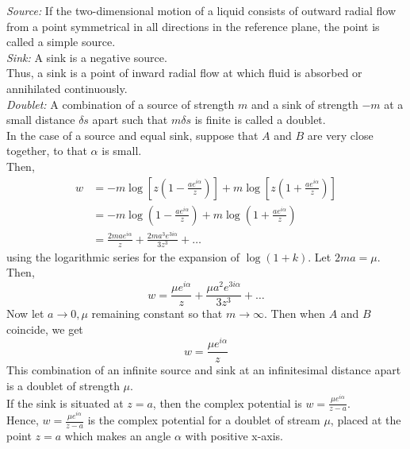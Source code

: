 \documentclass[12pt]{article}
\begin{document}
\begin{soln}
    
    \emph{Source:} If the two-dimensional motion of a liquid consists of outward radial flow from a point symmetrical in all directions in the reference plane, the point is called a simple source.\\
    \emph{Sink:} A sink is a negative source.\\
    Thus, a sink is a point of inward radial flow at which fluid is absorbed or annihilated continuously.\\
    \emph{Doublet:} A combination of a source of strength $ m $ and a sink of strength $ -m $ at a small distance $ \delta s $ apart such that $ m\delta s $ is finite is called a doublet.\\

    In the case of a source and equal sink, suppose that $ A $ and $ B$ are very close together, to that $ \alpha $ is small.\\Then,
    \begin{align*}
        w&=-m\log\left[ z\left( 1-\frac{ae^{i\alpha}}{z} \right) \right]+m\log\left[ z\left( 1+\frac{ae^{i\alpha}}{z} \right) \right]\\
        &=-m\log\left( 1-\frac{ae^{i\alpha}}{z} \right)+m\log\left( 1+\frac{ae^{i\alpha}}{z} \right)\\
        &=\frac{2mae^{i\alpha}}{z}+\frac{2ma^3e^{3i\alpha}}{3z^3}+\dots
    \end{align*}
    using the logarithmic series for the expansion of $ \log(1+k) $. Let $ 2ma=\mu $. Then,
    \[
        w=\frac{\mu e^{i\alpha}}{z}+\frac{\mu a^2 e^{3i\alpha}}{3z^3}+\dots
    \]
    Now let $ a\to 0, \mu $ remaining constant so that $ m\to\infty $. Then when $ A $ and $ B $ coincide, we get 
    \[
        w=\frac{\mu e^{i\alpha}}{z}
    \]
    This combination of an infinite source and sink at an infinitesimal distance apart is a doublet of strength $ \mu $.\\
    If the sink is situated at $ z=a $, then the complex potential is $ w=\frac{\mu e^{i\alpha}}{z-a} $.\\
    Hence, $ w=\frac{\mu e^{i\alpha}}{z-a} $ is the complex potential for a doublet of stream $ \mu $, placed at the point $ z=a $ which makes an angle $ \alpha $ with positive x-axis.
\end{soln}
\end{document}
